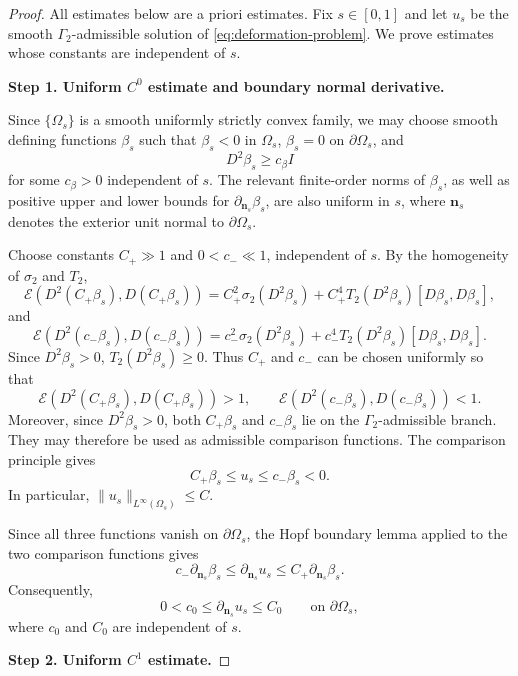 \documentclass{article}
\numberwithin{equation}{section}
\begin{document}
\begin{proof}

All estimates below are a priori estimates. Fix $s\in[0,1]$
and let $u_s$ be the smooth $\Gamma_2$-admissible solution of
\eqref{eq:deformation-problem}. We prove estimates whose constants are independent of $s$.

\medskip
\noindent\textbf{Step 1. Uniform $C^0$ estimate and boundary normal derivative.}

Since $\{\Omega_s\}$ is a smooth uniformly strictly convex family,
we may choose smooth defining functions $\beta_s$ such that
$\beta_s<0$ in $\Omega_s$, $\beta_s=0$ on $\partial\Omega_s$, and
\[
D^2\beta_s\ge c_\beta I
\]
for some $c_\beta>0$ independent of $s$. The relevant finite-order
norms of $\beta_s$, as well as positive upper and lower bounds for
$\partial_{\mathbf n_s}\beta_s$, are also uniform in $s$, where
$\mathbf n_s$ denotes the exterior unit normal to $\partial\Omega_s$.

Choose constants $C_+\gg1$ and $0<c_-\ll1$, independent of $s$.
By the homogeneity of $\sigma_2$ and $T_2$,
\[
\mathcal E(D^2(C_+\beta_s),D(C_+\beta_s))
=
C_+^2\sigma_2(D^2\beta_s)
+
C_+^4T_2(D^2\beta_s)[D\beta_s,D\beta_s],
\]
and
\[
\mathcal E(D^2(c_-\beta_s),D(c_-\beta_s))
=
c_-^2\sigma_2(D^2\beta_s)
+
c_-^4T_2(D^2\beta_s)[D\beta_s,D\beta_s].
\]
Since $D^2\beta_s>0$, $T_2(D^2\beta_s)\ge0$. Thus $C_+$ and $c_-$
can be chosen uniformly so that
\[
\mathcal E(D^2(C_+\beta_s),D(C_+\beta_s))>1,
\qquad
\mathcal E(D^2(c_-\beta_s),D(c_-\beta_s))<1.
\]
Moreover, since $D^2\beta_s>0$, both $C_+\beta_s$ and
$c_-\beta_s$ lie on the $\Gamma_2$-admissible branch. They may
therefore be used as admissible comparison functions.
The comparison principle gives
\begin{equation}\label{eq:uniform-C0-barriers}
C_+\beta_s\le u_s\le c_-\beta_s<0.
\end{equation}
In particular, $\|u_s\|_{L^\infty(\Omega_s)}\le C$.

Since all three functions vanish on $\partial\Omega_s$, the Hopf boundary lemma applied to the two comparison functions gives
\[
c_-\partial_{\mathbf n_s}\beta_s
\le \partial_{\mathbf n_s}u_s
\le C_+\partial_{\mathbf n_s}\beta_s.
\]
Consequently,
\begin{equation}\label{eq:uniform-hopf}
0<c_0\le\partial_{\mathbf n_s}u_s\le C_0
\qquad\text{on }\partial\Omega_s,
\end{equation}
where $c_0$ and $C_0$ are independent of $s$.

\medskip
\noindent\textbf{Step 2. Uniform $C^1$ estimate.}


\end{proof}
\end{document}
